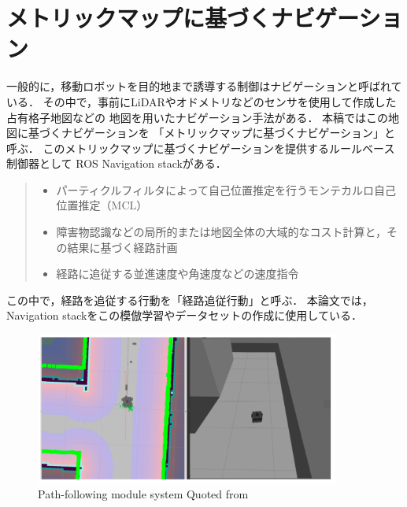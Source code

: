 \section{メトリックマップに基づくナビゲーション}
一般的に，移動ロボットを目的地まで誘導する制御はナビゲーションと呼ばれている．
その中で，事前にLiDARやオドメトリなどのセンサを使用して作成した占有格子地図などの
地図を用いたナビゲーション手法がある．
本稿ではこの地図に基づくナビゲーションを
「メトリックマップに基づくナビゲーション」と呼ぶ．
このメトリックマップに基づくナビゲーションを提供するルールベース制御器として
ROS Navigation stack\cite{ros}がある．
\begin{quote}
    \begin{itemize}
     \item パーティクルフィルタによって自己位置推定を行うモンテカルロ自己位置推定（MCL）
     \item 障害物認識などの局所的または地図全体の大域的なコスト計算と，その結果に基づく経路計画
     \item 経路に追従する並進速度や角速度などの速度指令
    \end{itemize}
   \end{quote}
この中で，経路を追従する行動を「経路追従行動」と呼ぶ．
本論文では，Navigation stackをこの模倣学習やデータセットの作成に使用している．
\begin{figure}[htbp]
    \centering
     \includegraphics[width=100mm]{images/pdf/nav.pdf}
     \caption{Path-following module system Quoted from\cite{shimada2020}}
     \label{fig:nav}
\end{figure}

\newpage
